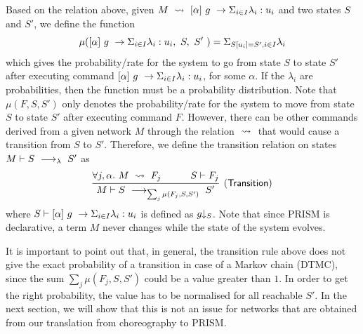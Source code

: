 Based on the relation above, given
$M\ \stackrel{}{\rightsquigarrow}\ [\alpha]\ g\ \rightarrow \Sigma_{i\in I}\lambda_i: u_i$ and two
states $S$ and $S'$, we define the function
$$\mu([\alpha]\ g\ \rightarrow \Sigma_{i\in I}\lambda_i: u_i,\ S,\ S'\ ) = \Sigma_{S[u_i]=S',i\in I}\lambda_i$$
which gives the probability/rate for the system to go from state $S$
to state $S'$ after executing command $[\alpha]\ g\ \rightarrow \Sigma_{i\in I}\lambda_i: u_i$,
for some $\alpha$.
If the $\lambda_i$ are probabilities, then the function must be a
probability distribution. Note that $\mu(F,S,S')$ only denotes the
probability/rate for the system to move from state $S$ to state $S'$
after executing command $F$. However, there can be other commands
derived from a given network $M$ through the relation $\ \stackrel{}{\rightsquigarrow}\ $
that would cause a transition from $S$ to $S'$. Therefore, we define
the transition relation on states $M\vdash S\ \longrightarrow_{\lambda}\ S'$ as
$$
\infer[\mathsf{(Transition)}]
{
  M\vdash S\red{\sum_{j} \mu(F_j,S,S')}S'
}
{
  \forall j,\alpha.\ M\prismred{}F_j
  \quad&\quad
  S\vdash F_j
}
$$
where $S\vdash [\alpha]\ g\ \rightarrow \Sigma_{i\in I}\lambda_i: u_i$ is defined as $g\!\!\downarrow_{S}$.
Note that since PRISM is declarative, a term $M$ never changes while
the state of the system evolves.

It is important to point out that, in general, the transition rule
above does not give the exact probability of a transition in case of a
Markov chain (DTMC), since the sum ${\sum_{j} \mu(F_j,S,S')}$ could be
a value greater than $1$. In order to get the right probability, the
value has to be normalised for all reachable $S'$. In the next
section, we will show that this is not an issue for networks that are
obtained from our translation from choreography to PRISM.

